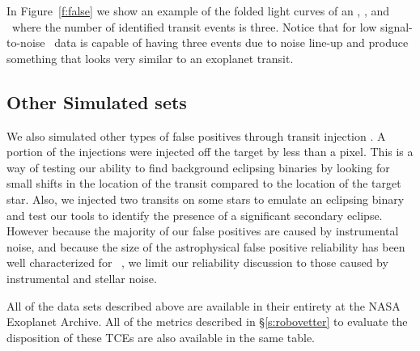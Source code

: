 In Figure~\ref{f:false} we show an example of the folded light curves of an \opstce, \invtce, and \scrtce\ where the number of identified transit events is three.  Notice that for low signal-to-noise \Kepler\ data is capable of having three events due to noise line-up and produce something that looks very similar to an exoplanet transit.  


\subsection{Other Simulated sets}
We also simulated other types of false positives through transit injection \citep{Christiansen2017}. A portion of the injections were injected off the target by less than a pixel.  This is a way of testing our ability to find background eclipsing binaries by looking for small shifts in the location of the transit compared to the location of the target star.  Also, we injected two transits on some stars to emulate an eclipsing binary and test our tools to identify the presence of a significant secondary eclipse.  However because the majority of our false positives are caused by instrumental noise, and because the size of the astrophysical false positive reliability has been well characterized for \Kepler\ \citep[e.g.][]{Morton2016}, we limit our reliability discussion to those caused by instrumental and stellar noise. 


All of the data sets described above are available in their entirety at the NASA Exoplanet Archive.  All of the metrics described in \S\ref{s:robovetter} to evaluate the disposition of these TCEs are also available in the same table. 